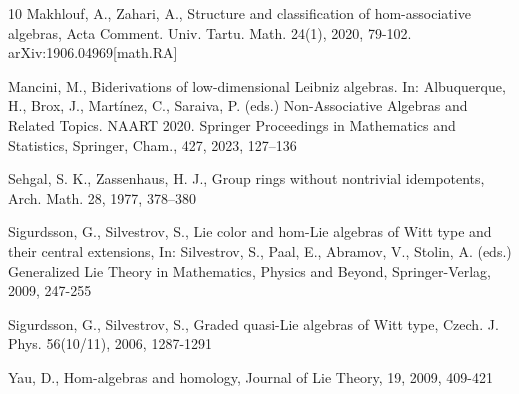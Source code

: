 \documentclass[12pt]{article}
\begin{document}
\begin{thebibliography}{10}
			 Makhlouf, A., Zahari, A., Structure and classification of hom-associative algebras,
			Acta Comment. Univ. Tartu. Math. 24(1), 2020, 79-102. \\ arXiv:1906.04969[math.RA]
			
			 Mancini, M., Biderivations of low-dimensional Leibniz algebras. In: Albuquerque, H., Brox, J., Martínez, C., Saraiva, P. (eds.) Non-Associative Algebras and Related Topics. NAART 2020. Springer Proceedings in Mathematics and Statistics, Springer, Cham., 427, 2023, 127–136
			
			 Sehgal, S. K., Zassenhaus, H. J., Group rings without nontrivial idempotents, Arch. Math. 28, 1977, 378–380
			
			 Sigurdsson, G., Silvestrov, S., Lie color and hom-Lie algebras of Witt type and their central extensions, In: Silvestrov,  S., Paal,  E., Abramov,  V., Stolin,  A. (eds.) Generalized Lie Theory in Mathematics, Physics and Beyond, Springer-Verlag, 2009, 247-255
			
			 Sigurdsson, G., Silvestrov, S., Graded quasi-Lie algebras of Witt type, Czech. J. Phys. {56}(10/11), 2006, 1287-1291
			
			 Yau, D., Hom-algebras and homology, Journal of Lie Theory, {19}, 2009, 409-421
			
		\end{thebibliography}
	
\end{document}
